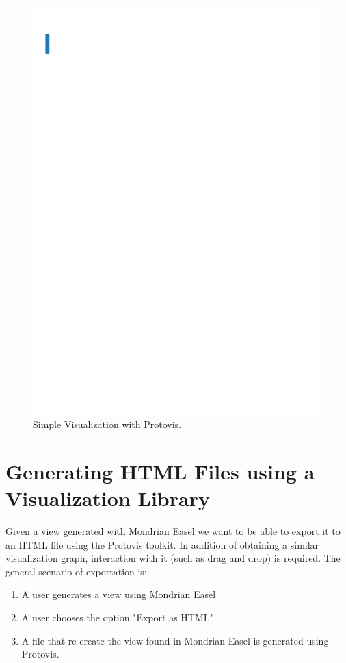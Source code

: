 \documentclass[preprint,10pt]{sigplanconf}
\newcommand{\seclabel}[1]{\label{sec:#1}}
\begin{document}
\begin{figure}
\begin{raggedright}
\includegraphics[bb=20bp 743bp 100bp 812bp,scale=0.99]{SimpleBar} 
\par\end{raggedright}

\caption{Simple Visualization with Protovis.\label{fig:SimpleBar}}

\end{figure}  

\section{Generating HTML Files using a Visualization Library}\seclabel{refactoring}

Given a view generated with Mondrian Easel we want to be able to export it to an HTML file using the Protovis toolkit. In addition of obtaining a similar visualization graph, interaction with it (such as drag and drop) is required. The general scenario of exportation is: 
\begin{enumerate}
\item A user generates a view using Mondrian Easel
\item A user chooses the option "Export as HTML"
\item A file that re-create the view found in Mondrian Easel is generated using Protovis. 
\end{enumerate}
\end{document}
